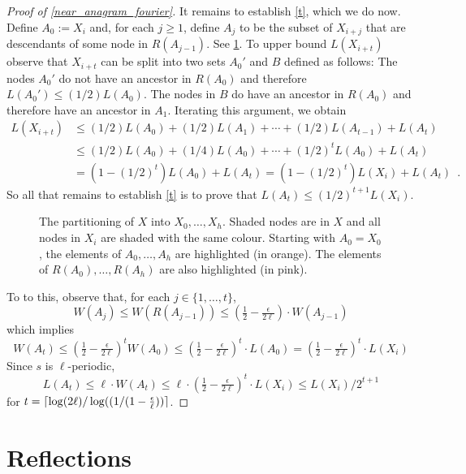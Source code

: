 \documentclass{patmorin}
\begin{document}
\begin{proof}[Proof of \cref{near_anagram_fourier}]
  It remains to establish \cref{t}, which we do now.  Define $A_0:= X_i$ and, for each $j\ge 1$, define $A_j$ to be the subset of $X_{i+j}$ that are descendants of some node in $R(A_{j-1})$.  See \cref{bigtree}.  To upper bound $L(X_{i+t})$ observe that $X_{i+t}$ can be split into two sets $A_0'$ and $B$ defined as follows:  The nodes $A_0'$ do not have an ancestor in $R(A_0)$ and therefore $L(A_0')\le (1/2)L(A_0)$. The nodes in $B$ do have an ancestor in $R(A_0)$ and therefore have an ancestor in $A_1$.  Iterating this argument, we obtain
 \begin{align*}
      L(X_{i+t})
         &\le (1/2)L(A_0) + (1/2)L(A_1) + \cdots + (1/2)L(A_{t-1}) + L(A_t) \\
         &\le (1/2)L(A_0) + (1/4)L(A_0) + \cdots + (1/2)^t L(A_{0}) + L(A_t) \\
         &  = (1-(1/2)^t)L(A_0) + L(A_t) = (1-(1/2)^t)L(X_i) + L(A_t)  \enspace .
   \end{align*}
  So all that remains to establish \ref{t} is to prove that
  $L(A_t)\le (1/2)^{t+1}L(X_i)$.

  \begin{figure}
    \caption{The partitioning of $X$ into $X_0,\ldots,X_h$. Shaded
    nodes are in $X$ and all nodes in $X_i$ are shaded with the same
    colour.   Starting with $A_0=X_0$, the elements of $A_0,\ldots,A_h$
    are highlighted (in orange).  The elements of $R(A_0),\ldots,R(A_h)$ are also highlighted (in pink).}
    \label{bigtree}
  \end{figure}

  To to this, observe that, for each $j\in\{1,\ldots,t\}$,
  \begin{equation}
      W(A_j)
        \le W(R(A_{j-1}))
        \le (\tfrac12-\tfrac{\epsilon}{2\ell})\cdot W(A_{j-1})
  \end{equation}
  which implies
  \[
       W(A_t)
       \le (\tfrac12-\tfrac{\epsilon}{2\ell})^t W(A_0) \le (\tfrac12-\tfrac{\epsilon}{2\ell})^t\cdot L(A_0)
       =  (\tfrac12-\tfrac{\epsilon}{2\ell})^t\cdot L(X_i)
  \]
  Since $s$ is $\ell$-periodic,
  \[
        L(A_t)\le \ell\cdot W(A_t) \le \ell\cdot(\tfrac12-\tfrac{\epsilon}{2\ell})^t\cdot L(X_i) \le L(X_i)/2^{t+1}
  \]
  for $t = {\lceil \log(2\ell)/\log((1/(1-\tfrac{\epsilon}{\ell})) \rceil}$.
\end{proof}

\section{Reflections}
\label{reflections}
\end{document}
